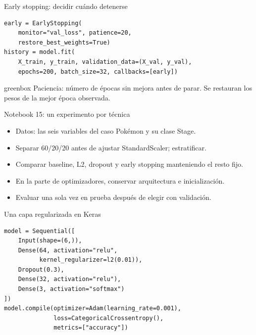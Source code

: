\documentclass[10pt,aspectratio=169,xcolor={dvipsnames}]{beamer}
\newenvironment{caja}[1][lgraybox]{\begin{beamercolorbox}[sep=0.7em,wd=\linewidth]{#1}}{\end{beamercolorbox}}
\begin{document}
\begin{frame}[fragile]{Early stopping: decidir cuándo detenerse}
\begin{lstlisting}
early = EarlyStopping(
    monitor="val_loss", patience=20,
    restore_best_weights=True)
history = model.fit(
    X_train, y_train, validation_data=(X_val, y_val),
    epochs=200, batch_size=32, callbacks=[early])
\end{lstlisting}
\begin{caja}[greenbox]
Paciencia: número de épocas sin mejora antes de parar. Se restauran los pesos de la mejor época observada.
\end{caja}

\end{frame}

\begin{frame}{Notebook 15: un experimento por técnica}
\begin{itemize}
\item Datos: las seis variables del caso Pokémon y su clase Stage.
\item Separar 60/20/20 antes de ajustar StandardScaler; estratificar.
\item Comparar baseline, L2, dropout y early stopping manteniendo el resto fijo.
\item En la parte de optimizadores, conservar arquitectura e inicialización.
\item Evaluar una sola vez en prueba después de elegir con validación.
\end{itemize}
\end{frame}

\begin{frame}[fragile]{Una capa regularizada en Keras}
\begin{lstlisting}
model = Sequential([
    Input(shape=(6,)),
    Dense(64, activation="relu",
          kernel_regularizer=l2(0.01)),
    Dropout(0.3),
    Dense(32, activation="relu"),
    Dense(3, activation="softmax")
])
model.compile(optimizer=Adam(learning_rate=0.001),
              loss=CategoricalCrossentropy(),
              metrics=["accuracy"])
\end{lstlisting}

\end{frame}
\end{document}
